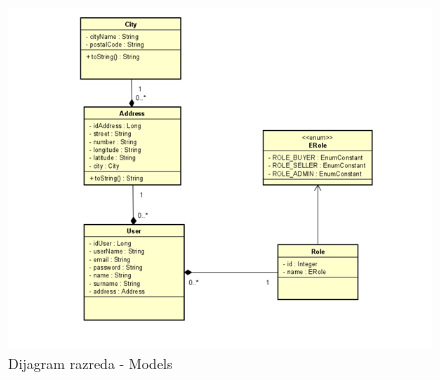 	
			\begin{figure}[H]
				\includegraphics[scale=1]{slike/DijagramRazredaM.PNG} %
				\centering
				\caption{Dijagram razreda - Models}
				\label{fig:dijagramRazredaC}
			\end{figure}
			
			\eject
		
